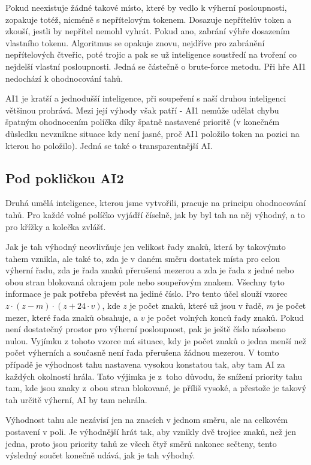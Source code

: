 \documentclass[a4paper,11pt,titlepage]{article}
\begin{document}
Pokud neexistuje žádné takové místo, které by vedlo k výherní posloupnosti, zopakuje totéž, nicméně s nepřítelovým tokenem. Dosazuje nepřítelův token a zkouší, jestli by nepřítel nemohl vyhrát. Pokud ano, zabrání výhře dosazením vlastního tokenu. Algoritmus se opakuje znovu, nejdříve pro za\-brá\-ně\-ní nepřítelových čtveřic, poté trojic a pak se už inteligence soustředí na tvoření co nejdelší vlastní posloupnosti. Jedná se částečně o brute-force metodu. Při hře AI1 nedochází k ohodnocování tahů.

AI1 je kratší a jednodušší inteligence, při soupeření s naší druhou inteligenci většinou prohrává. Mezi její výhody však patří  - AI1 nemůže udělat chybu špatným ohodnocením políčka díky špatně nastavené prioritě (v konečném důsledku nevznikne situace kdy není jasné, proč AI1 položilo token na pozici na kterou ho položilo). Jedná se také o transparentnější AI.

\subsection{Pod pokličkou AI2}
Druhá umělá inteligence, kterou jsme vytvořili, pracuje na principu ohodnocování tahů. Pro každé volné políčko vyjádří číselně, jak by byl tah na něj výhodný, a to pro křížky a kolečka zvlášť.

Jak je tah výhodný neovlivňuje jen velikost řady znaků, která by takovýmto tahem vznikla, ale také to, zda je v daném směru dostatek místa pro celou výherní řadu, zda je řada znaků přerušená mezerou a zda je řada z jedné nebo obou stran blokovaná okrajem pole nebo soupeřovým znakem. Všechny tyto informace je pak potřeba převést na jediné číslo. Pro tento účel slouží vzorec $z \cdot (z - m) \cdot (z + 24\cdot v)$, kde $z$ je počet znaků, které už jsou v řadě, $m$ je počet mezer, které řada znaků obsahuje, a $v$ je počet volných konců řady znaků. Pokud není dostatečný prostor pro výherní posloupnost, pak je ještě číslo násobeno nulou. Vyjímku z tohoto vzorce má situace, kdy je počet znaků o jedna menší než počet výherních a současně není řada přerušena žádnou mezerou. V tomto případě je výhodnost tahu nastavena vysokou konstatou tak, aby tam AI za každých okolností hrála. Tato výjimka je z~toho důvodu, že snížení priority tahu tam, kde jsou znaky z~obou stran blokované, je příliš vysoké, a přestože je takový tah určitě výherní, AI by tam nehrála.

Výhodnost tahu ale nezávisí jen na znacích v jednom směru, ale na celkovém postavení v poli. Je výhodnější hrát tak, aby vznikly dvě trojice znaků, než jen jedna, proto jsou priority tahů ze všech čtyř směrů nakonec sečteny, tento výsledný součet konečně udává, jak je tah výhodný.
\end{document}
